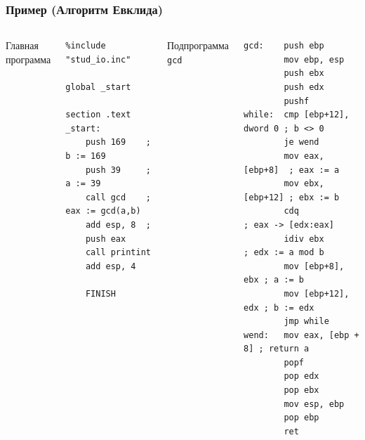 \documentclass[utf8, russian]{beamer}
\begin{document}
    \begin{frame}[fragile]
        \frametitle{Пример (Алгоритм Евклида)}
        \begin{columns}[T]
            \scriptsize
            Главная программа
            \begin{verbatim}
%include "stud_io.inc"

global _start

section .text
_start:
    push 169    ; b := 169
    push 39     ; a := 39
    call gcd    ; eax := gcd(a,b)
    add esp, 8  ; 
    push eax    
    call printint
    add esp, 4

    FINISH
            \end{verbatim}
            Подпрограмма {\tt gcd}
            \begin{verbatim}
gcd:    push ebp
        mov ebp, esp
        push ebx
        push edx
        pushf
while:  cmp [ebp+12], dword 0 ; b <> 0
        je wend
        mov eax, [ebp+8]  ; eax := a
        mov ebx, [ebp+12] ; ebx := b
        cdq               ; eax -> [edx:eax]
        idiv ebx          ; edx := a mod b
        mov [ebp+8],  ebx ; a := b
        mov [ebp+12], edx ; b := edx
        jmp while
wend:   mov eax, [ebp + 8] ; return a
        popf
        pop edx
        pop ebx
        mov esp, ebp
        pop ebp
        ret
            \end{verbatim}
        \end{columns}
\end{frame}
\end{document}
